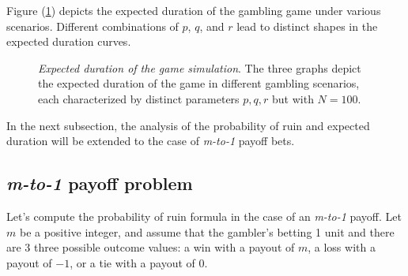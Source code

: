 \documentclass[11pt,twoside]{article}
\numberwithin{Theorem}{section}
\numberwithin{Definition}{section}
\numberwithin{Lemma}{section}
\numberwithin{Algorithm}{section}
\numberwithin{equation}{section}
\begin{document}
Figure (\ref{fig:duration}) depicts the expected duration of the gambling game under various scenarios. Different combinations of $p$, $q$, and $r$ lead to distinct shapes in the expected duration curves.

\begin{figure}[h!]
  \centering
  \caption[Expected duration of the game simulation]{\textit{Expected duration of the game simulation}. The three graphs depict the expected duration of the game in different gambling scenarios, each characterized by distinct parameters $p,q,r$ but with $N = 100$.}  
  \label{fig:duration}
\end{figure}


In the next subsection, the analysis of the probability of ruin and expected duration will be extended to the case of \textit{m-to-1} payoff bets.

\subsection{\textit{m-to-1} payoff problem}
Let's compute the probability of ruin formula in the case of an \textit{m-to-1} payoff. Let $m$ be a positive integer, and assume that the gambler's betting 1 unit and there are 3 three possible outcome values: a win with a payout of $m$, a loss with a payout of $-1$, or a tie with a payout of $0$.
\end{document}
